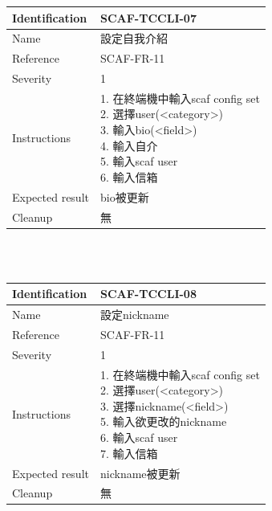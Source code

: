 \documentclass{report}
\begin{document}
\begin{tabularx}{\textwidth}{
  |p{}%
  |p{}|%
  }
  \hline
  \centering Identification &  SCAF-TCCLI-07 \\
  \hline
  \centering Name & 設定自我介紹 \\
  \hline
  \centering Reference & SCAF-FR-11 \\
  \hline
  \centering Severity & 1 \\
  \hline
  \centering Instructions & 
  \makecell[l]{
    1. 在終端機中輸入scaf config set  \\
    2. 選擇user(<category>) \\
    3. 輸入bio(<field>) \\
    4. 輸入自介 \\
    5. 輸入scaf user \\
    6. 輸入信箱  \\
  }\\
  \hline
  \centering Expected result & bio被更新 \\
  \hline
  \centering Cleanup & 無 \\
  \hline
\end{tabularx}
\\
\newline
\\

\begin{tabularx}{\textwidth}{
  |p{}%
  |p{}|%
  }
  \hline
  \centering Identification &  SCAF-TCCLI-08 \\
  \hline
  \centering Name & 設定nickname \\
  \hline
  \centering Reference & SCAF-FR-11 \\
  \hline
  \centering Severity & 1 \\
  \hline
  \centering Instructions & 
  \makecell[l]{
    1. 在終端機中輸入scaf config set  \\
    2. 選擇user(<category>) \\
    3. 選擇nickname(<field>) \\
    5. 輸入欲更改的nickname \\
    6. 輸入scaf user \\
    7. 輸入信箱  \\
  }\\
  \hline
  \centering Expected result & nickname被更新 \\
  \hline
  \centering Cleanup & 無 \\
  \hline
\end{tabularx}
\\
\newline
\\
\end{document}
